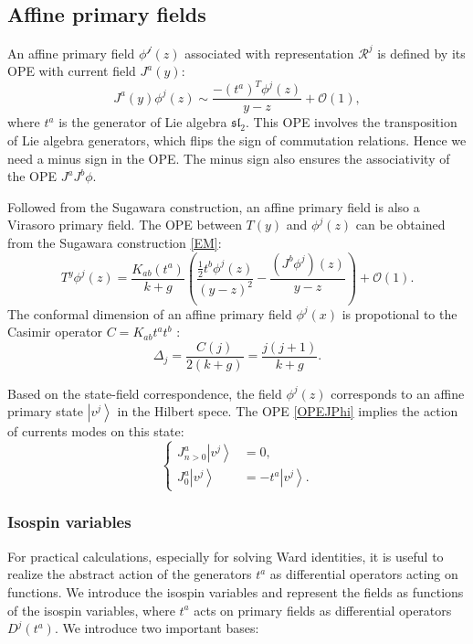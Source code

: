 \documentclass[10pt,a4paper]{article}
\numberwithin{equation}{section}
\newcommand{\ket}[1]{\left| #1 \right\rangle}
\begin{document}
\subsection{Affine primary fields}
An affine primary field $\phi^{\mathcal{j}}(z)$ associated with representation $\mathcal{R}^{j}$ is defined by its OPE with current field 
$J^{a}(y)$:
\begin{equation}
    \boxed{
        J^{a}(y) \phi^{j}(z) \sim \frac{-(t^{a})^{T} \phi^{j}(z)}{y-z} + \mathcal{O}(1), \label{OPEJPhi}
    }
\end{equation}
where $t^{a}$ is the generator of Lie algebra $\mathfrak{sl}_{2}$. This OPE involves the transposition of Lie algebra generators, which 
flips the sign of commutation relations. Hence we need a minus sign in the OPE. The minus sign also ensures the associativity of 
the OPE $J^{a}J^{b} \phi$. 

Followed from the Sugawara construction, an affine primary field is also a Virasoro primary field. 
The OPE between $T(y)$ and $\phi^{j}(z)$ can be obtained from the Sugawara construction \ref{EM}:
\begin{equation}
    T^{y} \phi^{j}(z) = \frac{K_{ab} (t^{a})}{k+g} \left( \frac{\frac{1}{2} t^{b} \phi^{j}(z)}{(y-z)^{2}} - \frac{\left(J^{b} \phi^{j}\right)(z)}{y-z} \right) + \mathcal{O}(1).
\end{equation}
The conformal dimension of an affine primary field $\phi^{j}(x)$ is propotional to the Casimir operator $C = K_{ab} t^{a} t^{b}$ :
\begin{equation}
    \boxed{
        \Delta_{j} = \frac{C(j)}{2(k+g)} = \frac{j(j+1)}{k+g}.
    }
\end{equation}

Based on the state-field correspondence, the field $\phi^{j}(z)$ corresponds to an affine primary state $\ket{v^{j}}$ in the Hilbert spece. 
The OPE \ref{OPEJPhi} implies the action of currents modes on this state:
\begin{equation}
    \left\{
        \begin{aligned}
            J^{a}_{n>0} \ket{v^{j}} &= 0,\\
            J^{a}_{0} \ket{v^{j}} &= - t^{a} \ket{v^{j}}.
        \end{aligned}
    \right.
\end{equation}

\subsubsection*{Isospin variables}
For practical calculations, especially for solving Ward identities, it is useful to realize the abstract action of the generators 
$t^{a}$ as differential operators acting on functions. We introduce the isospin variables and 
represent the fields as functions of the isospin variables, 
where $t^{a}$ acts on primary fields as differential operators $D^{j}(t^{a})$. We introduce two important bases:
\end{document}
